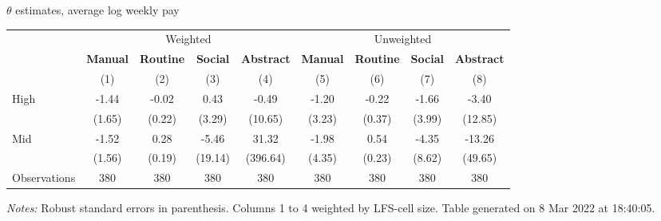 \begin{center}
\begin{threeparttable}[!h]
\caption{$ \theta $ estimates, average log weekly pay}
\begin{tabular}{lcccccccc}
\toprule
\toprule
& \multicolumn{4}{c}{Weighted} & \multicolumn{4}{c}{Unweighted} \\
&\multicolumn{1}{c}{\textbf{Manual}}&\multicolumn{1}{c}{\textbf{Routine}}&\multicolumn{1}{c}{\textbf{Social}}&\multicolumn{1}{c}{\textbf{Abstract}}&\multicolumn{1}{c}{\textbf{Manual}}&\multicolumn{1}{c}{\textbf{Routine}}&\multicolumn{1}{c}{\textbf{Social}}&\multicolumn{1}{c}{\textbf{Abstract}} \\
\textbf{}&\multicolumn{1}{c}{(1)}&\multicolumn{1}{c}{(2)}&\multicolumn{1}{c}{(3)}&\multicolumn{1}{c}{(4)}&\multicolumn{1}{c}{(5)}&\multicolumn{1}{c}{(6)}&\multicolumn{1}{c}{(7)}&\multicolumn{1}{c}{(8)} \\
\midrule
High                &       -1.44&       -0.02&        0.43&       -0.49&       -1.20&       -0.22&       -1.66&       -3.40\\
                    &      (1.65)&      (0.22)&      (3.29)&     (10.65)&      (3.23)&      (0.37)&      (3.99)&     (12.85)\\
Mid                 &       -1.52&        0.28&       -5.46&       31.32&       -1.98&        0.54&       -4.35&      -13.26\\
                    &      (1.56)&      (0.19)&     (19.14)&    (396.64)&      (4.35)&      (0.23)&      (8.62)&     (49.65)\\
Observations        &         380&         380&         380&         380&         380&         380&         380&         380\\
\bottomrule
\bottomrule
\end{tabular}
\begin{tablenotes}
\item \footnotesize \textit{Notes:} Robust standard errors in parenthesis. Columns 1 to 4 weighted by LFS-cell size. Table generated on  8 Mar 2022 at 18:40:05.
\end{tablenotes}
\end{threeparttable}
\end{center}
